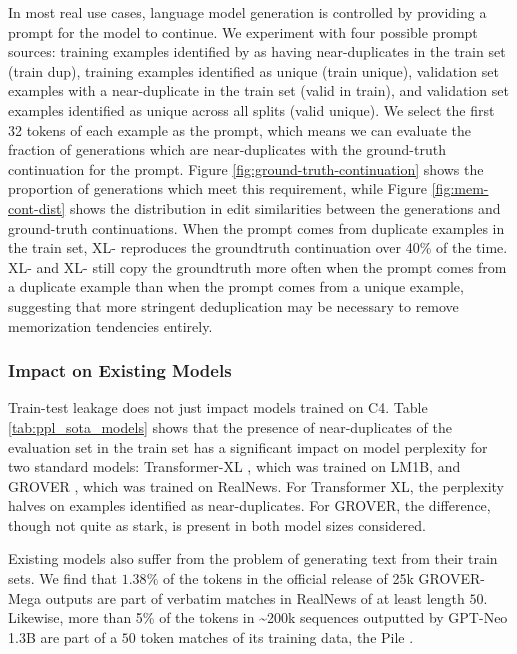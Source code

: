 In most real use cases, language model generation is controlled by providing a prompt for the model to continue.
We experiment with four possible prompt sources: training examples identified by \Exact{} as having near-duplicates in the train set (train dup), training examples identified as unique (train unique), validation set examples with a near-duplicate in the train set (valid in train), and validation set examples identified as unique across all splits (valid unique).
We select the first 32 tokens of each example as the prompt, which means we can evaluate the fraction of generations which are near-duplicates with the ground-truth continuation for the prompt.
Figure \ref{fig:ground-truth-continuation} shows the proportion of generations which meet this requirement, while Figure \ref{fig:mem-cont-dist} shows the distribution in edit similarities between the generations and ground-truth continuations.
When the prompt comes from duplicate examples in the train set, XL-\Original{} reproduces the groundtruth continuation over 40\% of the time.
XL-\Exact{} and XL-\Approx{} still copy the groundtruth more often when the prompt comes from a duplicate example than when the prompt comes from a unique example, suggesting that more stringent deduplication may be necessary to remove memorization tendencies entirely. 



\subsubsection{Impact on Existing Models} \label{sec:eval-existing-models}
Train-test leakage does not just impact models trained on C4.
Table \ref{tab:ppl_sota_models} shows that
the presence of near-duplicates of the evaluation set
in the train set has a significant impact on model perplexity for two standard models: Transformer-XL \citep{dai2019transformer}, which was trained on LM1B, and GROVER \citep{zellers2019defending}, which was trained on RealNews.
For Transformer XL, the perplexity halves on examples identified as near-duplicates.
For GROVER, the difference, though not quite as stark, is present in both model sizes considered.

Existing models also suffer from the problem of generating text from their train sets.
We find that $1.38\%$ of the tokens in the official release of 25k GROVER-Mega outputs
are part of verbatim matches in RealNews of at least length $50$.
Likewise, more than 5\% of the tokens in \textasciitilde 200k sequences outputted by GPT-Neo 1.3B \citep{gpt-neo} are part of a $50$ token matches of its training data, the Pile \citep{pile}.

